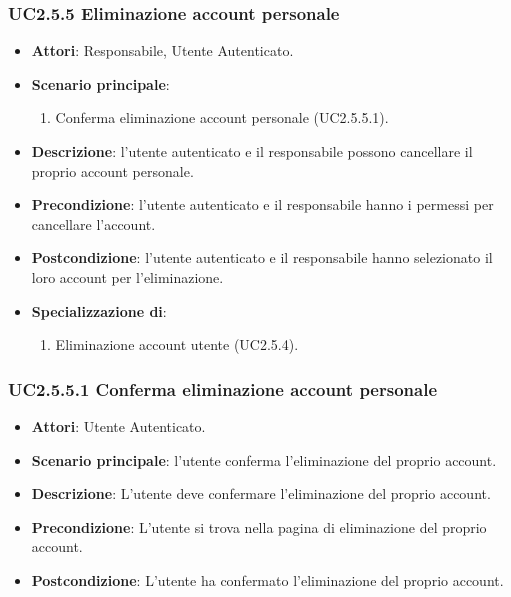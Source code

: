 \subsubsection{UC2.5.5 Eliminazione account personale}
\begin{itemize}
\item \textbf{Attori}: Responsabile, Utente Autenticato.
\item \textbf{Scenario principale}:
\begin{enumerate}
\item Conferma eliminazione account personale (UC2.5.5.1).
\end{enumerate}
\item \textbf{Descrizione}: l’utente autenticato e il responsabile possono cancellare il proprio account personale.
\item \textbf{Precondizione}: l’utente autenticato e il responsabile hanno i permessi per cancellare l’account.
\item \textbf{Postcondizione}: l’utente autenticato e il responsabile hanno selezionato il loro account per l’eliminazione.
\item \textbf{Specializzazione di}:
\begin{enumerate}
\item Eliminazione account utente (UC2.5.4).
\end{enumerate}
\end{itemize}
\subsubsection{UC2.5.5.1 Conferma eliminazione account personale}
\begin{itemize}
\item \textbf{Attori}: Utente Autenticato.
\item \textbf{Scenario principale}: l'utente conferma l'eliminazione del proprio account.
\item \textbf{Descrizione}: L'utente deve confermare l'eliminazione del proprio account.
\item \textbf{Precondizione}: L'utente si trova nella pagina di eliminazione del proprio account.
\item \textbf{Postcondizione}: L'utente ha confermato l'eliminazione del proprio account.
\end{itemize}
